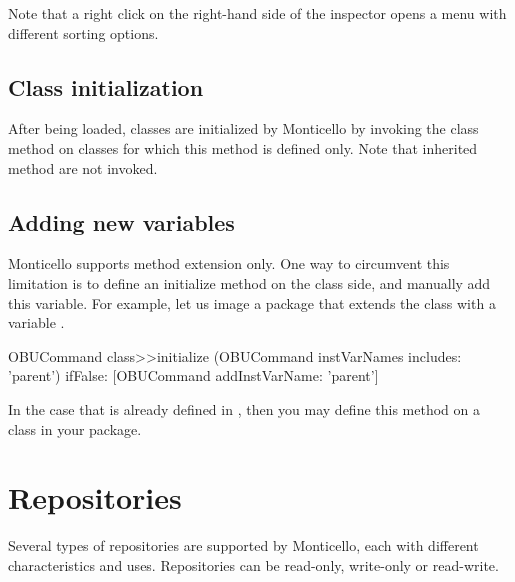 \documentclass[a4paper,10pt,twoside]{book}
\begin{document}
Note that a right click on the right-hand side of the inspector opens a menu with different sorting options.


\subsection{Class initialization}

After being loaded, classes are initialized by Monticello by invoking the  class method on classes for which this method is defined only. Note that inherited  method are not invoked. 

\subsection{Adding new variables}

Monticello supports method extension only. One way to circumvent this limitation is to define an initialize method on the class side, and manually add this variable. For example, let us image a package that extends the class  with a variable .

\begin{code}

OBUCommand class>>initialize
	(OBUCommand instVarNames includes: 'parent') 
		ifFalse: [OBUCommand addInstVarName: 'parent']
\end{code}

In the case that  is already defined in , then you may define this  method on a class in your package.

\section{Repositories}

Several types of repositories are supported by Monticello, each with different characteristics and uses. Repositories can be read-only, write-only or read-write.
\end{document}
